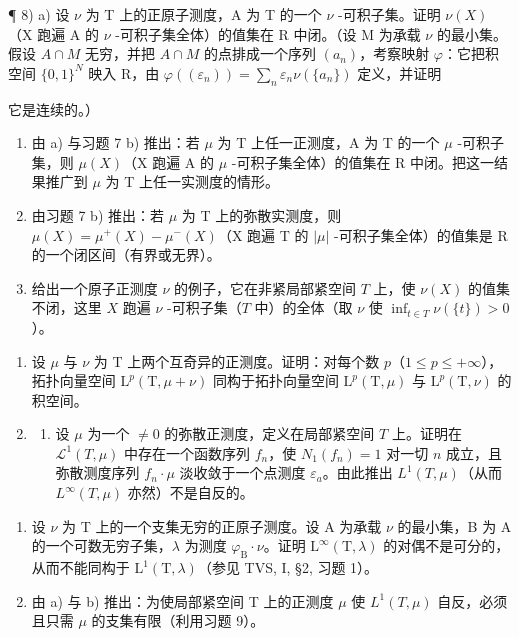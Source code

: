 ¶ 8) a) 设 \(\nu\) 为 T 上的正原子测度，A 为 T 的一个 \(\nu\) -可积子集。证明 \(\nu(X)\)（X 跑遍 A 的 \(\nu\) -可积子集全体）的值集在 R 中闭。（设 M 为承载 \(\nu\) 的最小集。假设 \(A \cap M\) 无穷，并把 \(A \cap M\) 的点排成一个序列 \((a_n)\)，考察映射 \(\varphi\)：它把积空间 \(\{0,1\}^N\) 映入 R，由 \(\varphi((\varepsilon_n)) = \sum_n \varepsilon_n \nu(\{a_n\})\) 定义，并证明

它是连续的。）

\begin{enumerate}
\def\labelenumi{\alph{enumi})}
\setcounter{enumi}{1}
\item
  由 a) 与习题 7 b) 推出：若 \(\mu\) 为 T 上任一正测度，A 为 T 的一个 \(\mu\) -可积子集，则 \(\mu(X)\)（X 跑遍 A 的 \(\mu\) -可积子集全体）的值集在 R 中闭。把这一结果推广到 \(\mu\) 为 T 上任一实测度的情形。
\item
  由习题 7 b) 推出：若 \(\mu\) 为 T 上的弥散实测度，则 \(\mu(X) = \mu^{+}(X) - \mu^{-}(X)\)（X 跑遍 T 的 \(|\mu|\) -可积子集全体）的值集是 R 的一个闭区间（有界或无界）。
\item
  给出一个原子正测度 \(\nu\) 的例子，它在非紧局部紧空间 \(T\) 上，使 \(\nu(X)\) 的值集不闭，这里 \(X\) 跑遍 \(\nu\) -可积子集（\(T\) 中）的全体（取 \(\nu\) 使 \(\inf_{t \in T} \nu(\{t\}) > 0\)）。
\end{enumerate}

\begin{enumerate}
\def\labelenumi{\arabic{enumi})}
\setcounter{enumi}{8}
\item
  设 \(\mu\) 与 \(\nu\) 为 T 上两个互奇异的正测度。证明：对每个数 \(p\)（\(1 \leqslant p \leqslant +\infty\)），拓扑向量空间 \(\mathrm{L}^p(\mathrm{T}, \mu + \nu)\) 同构于拓扑向量空间 \(\mathrm{L}^p(\mathrm{T}, \mu)\) 与 \(\mathrm{L}^p(\mathrm{T}, \nu)\) 的积空间。
\item
  \begin{enumerate}
  \def\labelenumii{\alph{enumii})}
  \tightlist
  \item
    设 \(\mu\) 为一个 \(\neq 0\) 的弥散正测度，定义在局部紧空间 \(T\) 上。证明在 \(\mathcal{L}^1(T, \mu)\) 中存在一个函数序列 \(f_n\)，使 \(N_1(f_n) = 1\) 对一切 \(n\) 成立，且弥散测度序列 \(f_n \cdot \mu\) 淡收敛于一个点测度 \(\varepsilon_a\)。由此推出 \(L^1(T, \mu)\)（从而 \(L^\infty(T, \mu)\) 亦然）不是自反的。
  \end{enumerate}
\end{enumerate}

\begin{enumerate}
\def\labelenumi{\alph{enumi})}
\setcounter{enumi}{1}
\item
  设 \(\nu\) 为 T 上的一个支集无穷的正原子测度。设 A 为承载 \(\nu\) 的最小集，B 为 A 的一个可数无穷子集，\(\lambda\) 为测度 \(\varphi_{\mathrm{B}} \cdot \nu\)。证明 \(\mathrm{L}^{\infty}(\mathrm{T}, \lambda)\) 的对偶不是可分的，从而不能同构于 \(\mathrm{L}^{1}(\mathrm{T}, \lambda)\)（参见 TVS, I, §2, 习题 1）。
\item
  由 a) 与 b) 推出：为使局部紧空间 T 上的正测度 \(\mu\) 使 \(L^{1}(T,\mu)\) 自反，必须且只需 \(\mu\) 的支集有限（利用习题 9）。
\end{enumerate}

